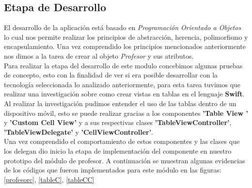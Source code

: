 	\subsection{Etapa de Desarrollo }
	 
	 El desarrollo de la aplicación está basado en \textit{Programación Orientado a Objetos} lo cual nos permite realizar los principios de abstracción, herencia, polimorfismo y encapsulamiento. Una vez comprendido los principios mencionados anteriormente nos dimos a la tarea de crear al objeto \textit{Profesor} y sus atributos. \\
	 
	  Para realizar la etapa del desarrollo de este modulo concebimos algunas pruebas de concepto, esto con la finalidad de ver si era posible desarrollar con la tecnología seleccionada  lo analizado anteriormente, para esta tarea tuvimos que realizar una investigación sobre como crear vistas en tablas en el lenguaje \textbf{Swift}.\\
	  
	  Al realizar la investigación pudimos entender el uso de las tablas dentro de un dispositivo móvil, esto se puede realizar gracias a los componentes \textbf{'Table View '} y \textbf{'Custom Cell View' } y  a sus respectivas clases \textbf{'TableViewController'}, \textbf{'TableViewDelegate'} y \textbf{ 'CellViewController'}. \\
	  
	  Una vez comprendido el comportamiento de estos componentes y las clases  que los delegan dio inicio la etapa de implementación del componente en nuestro prototipo del módulo de profesor. A continuación se muestran algunas evidencias de los códigos que fueron implementados para este módulo en las figuras: \ref{profesorc}, \ref{tableC}, \ref{tableCC}\\
	 
